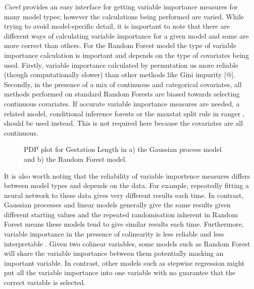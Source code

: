 \documentclass[10pt,]{article}
\begin{document}
\emph{Caret} provides an easy interface for getting variable importance measures for many model types; however the calculations being performed are varied. While trying to avoid model-specific detail, it is important to note that there are different ways of calculating variable importance for a given model \citep{oppel2009alternative, seifert2019surrogate} and some are more correct than others. For the Random Forest model the type of variable importance calculation is important and depends on the type of covariates being used. Firstly, variable importance calculated by permutation us more reliable (though computationally slower) than other methods like Gini impurity {[}@{]}. Secondly, in the presence of a mix of continuous and categorical covariates, all methods performed on standard Random Forests are biased towards selecting continuous covariates. If accurate variable importance measures are needed, a related model, conditional inference forests \citep{hothorn2006unbiased} or the maxstat split rule in ranger \citep{wright2017unbiased}, should be used instead. This is not required here because the covariates are all continuous.

\begin{figure}[t!]
  \centering

  \label{fig:pdp}
  \caption{
    PDP plot for Gestation Length in a) the Gaussian process model and b) the Random Forest model.
  }
\end{figure}

It is also worth noting that the reliability of variable importence measures differs between model types and depends on the data. For example, repeatedly fitting a neural network to these data gives very different results each time. In contrast, Gaussian processes and linear models generally give the same results given different starting values and the repeated randomisation inherent in Random Forest means these models tend to give similar results each time. Furthermore, variable importance in the presence of colinearity is less reliable and less interpretable \citep{dormann2013collinearity}. Given two colinear variables, some models such as Random Forest will share the variable importance between them potentially masking an important variable. In contrast, other models such as stepwise regression might put all the variable importance into one variable with no guarantee that the correct variable is selected.
\end{document}
